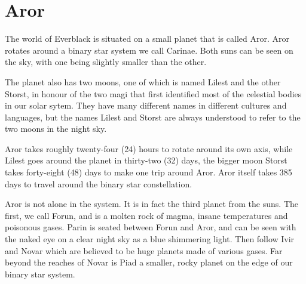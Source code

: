 \chapter{Aror}
\label{sec:Aror}

The world of Everblack is situated on a small planet that is called Aror. Aror
rotates around a binary star system we call Carinae. Both suns can be seen on
the sky, with one being slightly smaller than the other.

The planet also has two moons, one of which is named Lilest and the other
Storst, in honour of the two magi that first identified most of the celestial
bodies in our solar sytem. They have many different names in different
cultures and languages, but the names Lilest and Storst are always understood
to refer to the two moons in the night sky.

Aror takes roughly twenty-four (24) hours to rotate around its own axis, while
Lilest goes around the planet in thirty-two (32) days, the bigger moon Storst
takes forty-eight (48) days to make one trip around Aror. Aror itself takes
385 days to travel around the binary star constellation.

Aror is not alone in the system. It is in fact the third planet from the
suns. The first, we call Forun, and is a molten rock of magma, insane
temperatures and poisonous gases. Parin is seated between Forun and Aror, and
can be seen with the naked eye on a clear night sky as a blue shimmering
light. Then follow Ivir and Novar which are believed to be huge planets made
of various gases. Far beyond the reaches of Novar is Piad a smaller, rocky
planet on the edge of our binary star system.




















